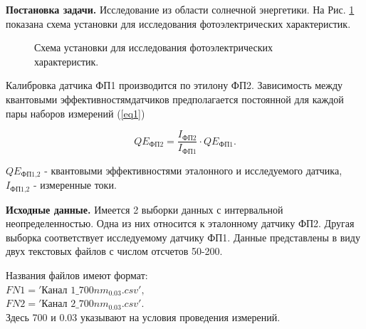 \textbf{Постановка задачи.}
Исследование из области солнечной энергетики\cite{litlink1}. На Рис. \ref{ris:image1} показана схема установки для исследования фотоэлектрических характеристик.

\begin{figure}[H]
	\caption{Схема установки для исследования фотоэлектрических характеристик.}
	\label{ris:image1}
\end{figure}

Калибровка датчика ФП1 производится по этилону ФП2. Зависимость между квантовыми эффективностямдатчиков предполагается постоянной для каждой пары наборов измерений (\ref{eq1})

\begin{equation} \label{eq1}
    QE_{\text{ФП2}} = \frac{I_{\text{ФП2}}}{I_{\text{ФП1}}} \cdot QE_{\text{ФП1}}.
\end{equation}

$QE_{\text{ФП1,2}}$ - квантовыми эффективностями эталонного и исследуемого датчика, $I_{\text{ФП1,2}}$ - измеренные токи.

\textbf{Исходные данные.}
Имеется 2 выборки данных с интервальной неопределенностью. Одна из них относится к эталонному датчику ФП2. Другая выборка соответствует исследуемому датчику ФП1. Данные представлены в виду двух текстовых файлов с числом отсчетов 50-200.

Названия файлов имеют формат:\\
$FN1='\text{Канал } 1\_700nm_0.03.csv',$\\
$FN2='\text{Канал } 2\_700nm_0.03.csv'.$\\
Здесь 700 и 0.03 указывают на условия проведения измерений.